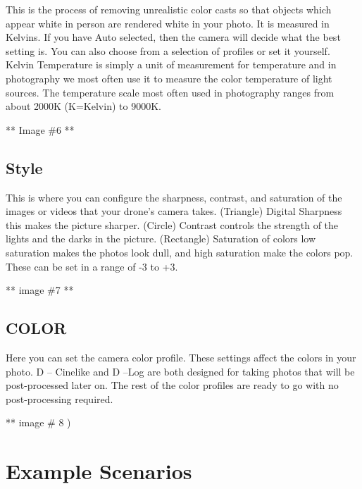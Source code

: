 \documentclass[
]{book}
\begin{document}
This is the process of removing unrealistic color casts so that objects which appear white in person are rendered white in your photo. It is measured in Kelvins. If you have Auto selected, then the camera will decide what the best setting is. You can also choose from a selection of profiles or set it yourself. Kelvin Temperature is simply a unit of measurement for temperature and in photography we most often use it to measure the color temperature of light sources. The temperature scale most often used in photography ranges from about 2000K (K=Kelvin) to 9000K.

** Image \#6 **

\hypertarget{style}{%
\subsection{Style}\label{style}}

This is where you can configure the sharpness, contrast, and saturation of the images or videos that your drone's camera takes. (Triangle) Digital Sharpness this makes the picture sharper. (Circle) Contrast controls the strength of the lights and the darks in the picture. (Rectangle) Saturation of colors low saturation makes the photos look dull, and high saturation make the colors pop. These can be set in a range of -3 to +3.

** image \#7 **

\hypertarget{color}{%
\subsection{COLOR}\label{color}}

Here you can set the camera color profile. These settings affect the colors in your photo. D -- Cinelike and D --Log are both designed for taking photos that will be post-processed later on. The rest of the color profiles are ready to go with no post-processing required.

** image \# 8 )

\hypertarget{example-scenarios}{%
\section{Example Scenarios}\label{example-scenarios}}
\end{document}

